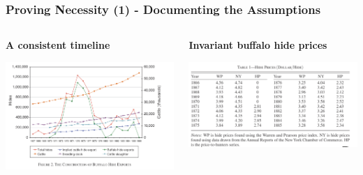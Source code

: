 \documentclass[aspectratio=169, 12pt, final]{beamer}
\begin{document}


\begin{frame}
\frametitle{Proving Necessity (1) - Documenting the Assumptions}
\begin{columns}
\begin{column}{0.5\textwidth}  %
\textbf{A consistent timeline}
    \begin{center}
     \includegraphics[width=1\textwidth]{Figure2_exports.jpeg}
     \end{center}
\end{column}
\begin{column}{0.5\textwidth}
\textbf{Invariant buffalo hide prices}
\begin{center}
\includegraphics[width=1\textwidth]{Table1.jpeg}	
\end{center}	
\end{column}
\end{columns}
\end{frame}
\end{document}
